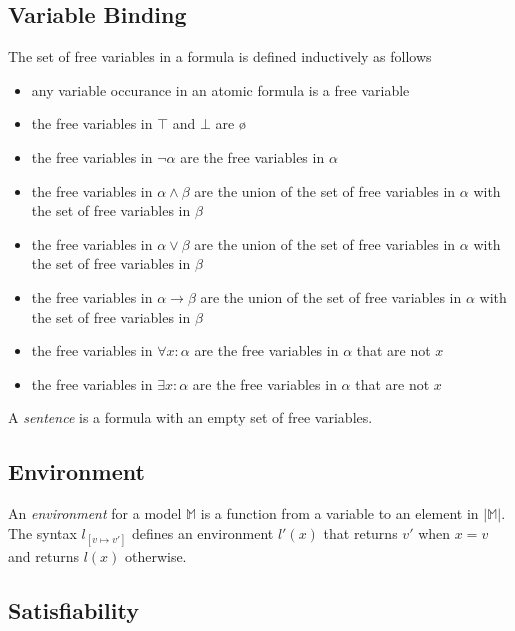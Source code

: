 	\subsection{Variable Binding}

		The set of free variables in a formula is defined inductively as follows
		\begin{itemize}
		\item any variable occurance in an atomic formula is a free variable
		\item the free variables in $\top$ and $\bot$ are {\o}
		\item the free variables in $\neg\alpha$ are the free variables in $\alpha$
		\item the free variables in $\alpha \wedge \beta$ are the union of the set of free variables in $\alpha$ with the set of free variables in $\beta$
		\item the free variables in $\alpha \vee   \beta$ are the union of the set of free variables in $\alpha$ with the set of free variables in $\beta$
		\item the free variables in $\alpha \to    \beta$ are the union of the set of free variables in $\alpha$ with the set of free variables in $\beta$
		\item the free variables in $\forall x : \alpha$ are the free variables in $\alpha$ that are not $x$
		\item the free variables in $\exists x : \alpha$ are the free variables in $\alpha$ that are not $x$
		\end{itemize}
		A \emph{sentence} is a formula with an empty set of free variables.

	\subsection{Environment}

		An \emph{environment} for a model $\mathbb{M}$ is a function from a
		variable to an element in $|\mathbb{M}|$. The syntax $l_{[v \mapsto
		v']}$ defines an environment $l'(x)$ that returns $v'$ when $x=v$ and
		returns $l(x)$ otherwise.

	\subsection{Satisfiability}

